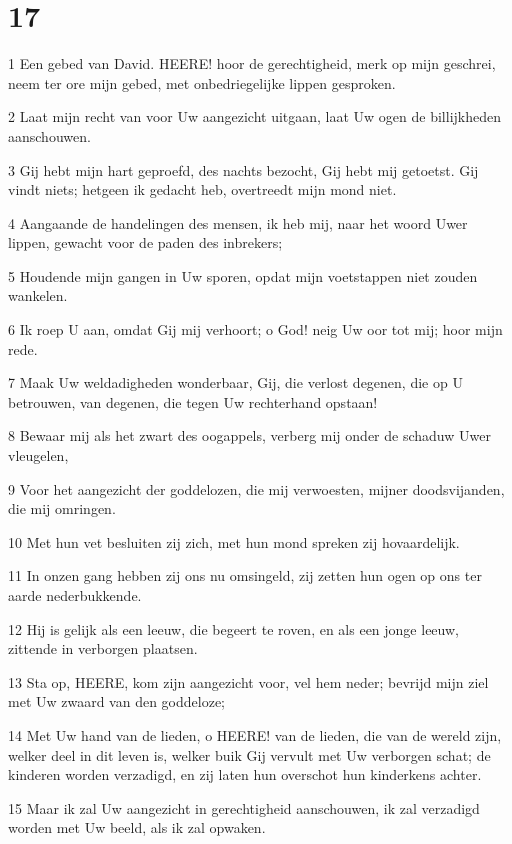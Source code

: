 \chapter{17}

\par 1 Een gebed van David. HEERE! hoor de gerechtigheid, merk op mijn geschrei, neem ter ore mijn gebed, met onbedriegelijke lippen gesproken.
\par 2 Laat mijn recht van voor Uw aangezicht uitgaan, laat Uw ogen de billijkheden aanschouwen.
\par 3 Gij hebt mijn hart geproefd, des nachts bezocht, Gij hebt mij getoetst. Gij vindt niets; hetgeen ik gedacht heb, overtreedt mijn mond niet.
\par 4 Aangaande de handelingen des mensen, ik heb mij, naar het woord Uwer lippen, gewacht voor de paden des inbrekers;
\par 5 Houdende mijn gangen in Uw sporen, opdat mijn voetstappen niet zouden wankelen.
\par 6 Ik roep U aan, omdat Gij mij verhoort; o God! neig Uw oor tot mij; hoor mijn rede.
\par 7 Maak Uw weldadigheden wonderbaar, Gij, die verlost degenen, die op U betrouwen, van degenen, die tegen Uw rechterhand opstaan!
\par 8 Bewaar mij als het zwart des oogappels, verberg mij onder de schaduw Uwer vleugelen,
\par 9 Voor het aangezicht der goddelozen, die mij verwoesten, mijner doodsvijanden, die mij omringen.
\par 10 Met hun vet besluiten zij zich, met hun mond spreken zij hovaardelijk.
\par 11 In onzen gang hebben zij ons nu omsingeld, zij zetten hun ogen op ons ter aarde nederbukkende.
\par 12 Hij is gelijk als een leeuw, die begeert te roven, en als een jonge leeuw, zittende in verborgen plaatsen.
\par 13 Sta op, HEERE, kom zijn aangezicht voor, vel hem neder; bevrijd mijn ziel met Uw zwaard van den goddeloze;
\par 14 Met Uw hand van de lieden, o HEERE! van de lieden, die van de wereld zijn, welker deel in dit leven is, welker buik Gij vervult met Uw verborgen schat; de kinderen worden verzadigd, en zij laten hun overschot hun kinderkens achter.
\par 15 Maar ik zal Uw aangezicht in gerechtigheid aanschouwen, ik zal verzadigd worden met Uw beeld, als ik zal opwaken.

